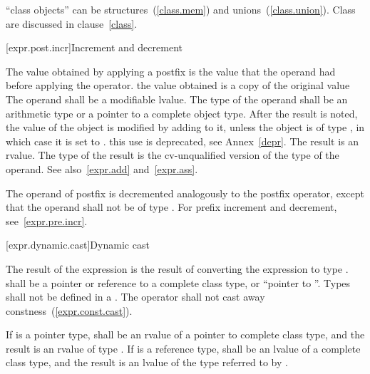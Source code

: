 \pnum
\enternote
``class objects'' can be structures~(\ref{class.mem}) and
unions~(\ref{class.union}). Class are discussed in clause~\ref{class}.
\exitnote

[expr.post.incr]{Increment and decrement}

\pnum
{}%
%
%
%
The value obtained by applying a postfix \tcode{++} is the value that
the operand had before applying the operator.
\enternote 
the value obtained is a copy of the original value
\exitnote 
The operand shall be a modifiable lvalue. The type of the operand shall
be an arithmetic type or a pointer to a complete object type. After the
result is noted, the value
of the object is modified by adding  to it,
%
%
unless the object is of type , in which case it is set to
.
\enternote 
this use is deprecated, see Annex~\ref{depr}.
\exitnote 
The result is an rvalue. The type of the result is the cv-unqualified
version of the type of the operand. See also~\ref{expr.add}
and~\ref{expr.ass}.

\pnum
{}%
%
%
%
The operand of postfix \tcode{\dcr} is decremented analogously to the
postfix \tcode{++} operator, except that the operand shall not be of
type .
\enternote 
For prefix increment and decrement, see~\ref{expr.pre.incr}.
\exitnote 

[expr.dynamic.cast]{Dynamic cast}

\pnum
{}%
%
The result of the expression  is the result of
converting the expression  to type .
%
 shall be a pointer or reference to a complete class type, or
``pointer to  ''. Types shall not be defined in
a . The  operator shall not cast
away constness~(\ref{expr.const.cast}).

\pnum
If  is a pointer type,  shall be an rvalue of a
pointer to complete class type, and the result is an rvalue of type
. If  is a reference type,  shall be
an lvalue of a complete class type, and the result is an lvalue of the
type referred to by .


